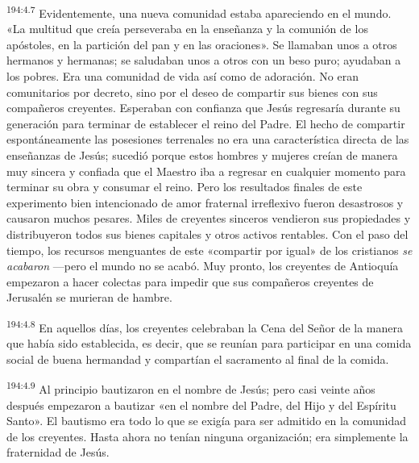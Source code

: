 \par 
\textsuperscript{194:4.7} Evidentemente, una nueva comunidad estaba apareciendo en el mundo. «La multitud que creía perseveraba en la enseñanza y la comunión de los apóstoles, en la partición del pan y en las oraciones». Se llamaban unos a otros hermanos y hermanas; se saludaban unos a otros con un beso puro; ayudaban a los pobres. Era una comunidad de vida así como de adoración. No eran comunitarios por decreto, sino por el deseo de compartir sus bienes con sus compañeros creyentes. Esperaban con confianza que Jesús regresaría durante su generación para terminar de establecer el reino del Padre. El hecho de compartir espontáneamente las posesiones terrenales no era una característica directa de las enseñanzas de Jesús; sucedió porque estos hombres y mujeres creían de manera muy sincera y confiada que el Maestro iba a regresar en cualquier momento para terminar su obra y consumar el reino. Pero los resultados finales de este experimento bien intencionado de amor fraternal irreflexivo fueron desastrosos y causaron muchos pesares. Miles de creyentes sinceros vendieron sus propiedades y distribuyeron todos sus bienes capitales y otros activos rentables. Con el paso del tiempo, los recursos menguantes de este «compartir por igual» de los cristianos \textit{se acabaron} ---pero el mundo no se acabó. Muy pronto, los creyentes de Antioquía empezaron a hacer colectas para impedir que sus compañeros creyentes de Jerusalén se murieran de hambre.

\par 
\textsuperscript{194:4.8} En aquellos días, los creyentes celebraban la Cena del Señor de la manera que había sido establecida, es decir, que se reunían para participar en una comida social de buena hermandad y compartían el sacramento al final de la comida.

\par 
\textsuperscript{194:4.9} Al principio bautizaron en el nombre de Jesús; pero casi veinte años después empezaron a bautizar «en el nombre del Padre, del Hijo y del Espíritu Santo». El bautismo era todo lo que se exigía para ser admitido en la comunidad de los creyentes. Hasta ahora no tenían ninguna organización; era simplemente la fraternidad de Jesús.

